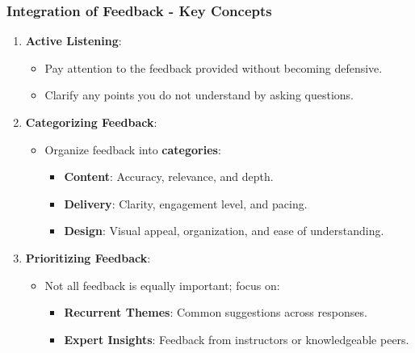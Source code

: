 \documentclass{beamer}
\begin{document}
\begin{frame}[fragile]
    \frametitle{Integration of Feedback - Key Concepts}
    \begin{enumerate}
        \item \textbf{Active Listening}:
        \begin{itemize}
            \item Pay attention to the feedback provided without becoming defensive.
            \item Clarify any points you do not understand by asking questions.
        \end{itemize}
        
        \item \textbf{Categorizing Feedback}:
        \begin{itemize}
            \item Organize feedback into \textbf{categories}:
            \begin{itemize}
                \item \textbf{Content}: Accuracy, relevance, and depth.
                \item \textbf{Delivery}: Clarity, engagement level, and pacing.
                \item \textbf{Design}: Visual appeal, organization, and ease of understanding.
            \end{itemize}
        \end{itemize}
        
        \item \textbf{Prioritizing Feedback}:
        \begin{itemize}
            \item Not all feedback is equally important; focus on:
            \begin{itemize}
                \item \textbf{Recurrent Themes}: Common suggestions across responses.
                \item \textbf{Expert Insights}: Feedback from instructors or knowledgeable peers.
            \end{itemize}
        \end{itemize}
    \end{enumerate}
\end{frame}
\end{document}
